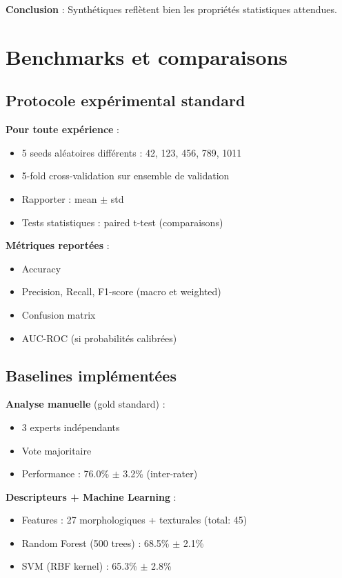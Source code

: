 \textbf{Conclusion} : Synthétiques reflètent bien les propriétés statistiques attendues.

\section{Benchmarks et comparaisons}

\subsection{Protocole expérimental standard}

\textbf{Pour toute expérience} :
\begin{itemize}
    \item 5 seeds aléatoires différents : 42, 123, 456, 789, 1011
    \item 5-fold cross-validation sur ensemble de validation
    \item Rapporter : mean $\pm$ std
    \item Tests statistiques : paired t-test (comparaisons)
\end{itemize}

\textbf{Métriques reportées} :
\begin{itemize}
    \item Accuracy
    \item Precision, Recall, F1-score (macro et weighted)
    \item Confusion matrix
    \item AUC-ROC (si probabilités calibrées)
\end{itemize}

\subsection{Baselines implémentées}

\textbf{Analyse manuelle} (gold standard) :
\begin{itemize}
    \item 3 experts indépendants
    \item Vote majoritaire
    \item Performance : 76.0\% $\pm$ 3.2\% (inter-rater)
\end{itemize}

\textbf{Descripteurs + Machine Learning} :
\begin{itemize}
    \item Features : 27 morphologiques + texturales (total: 45)
    \item Random Forest (500 trees) : 68.5\% $\pm$ 2.1\%
    \item SVM (RBF kernel) : 65.3\% $\pm$ 2.8\%
\end{itemize}

